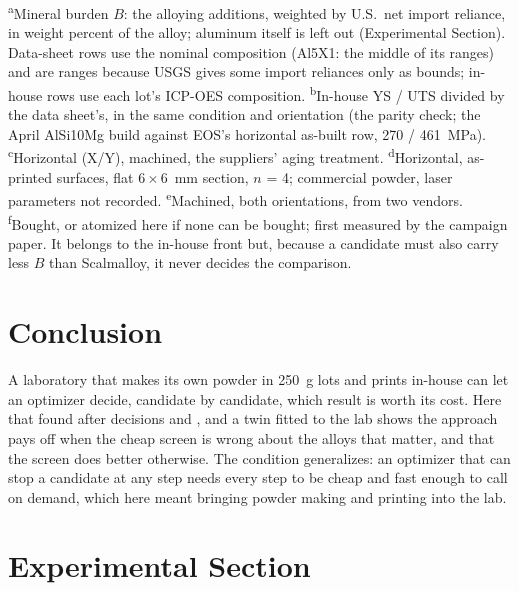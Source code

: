 \documentclass[11pt]{article}
\begin{document}
\begin{table}[t]
\smallskip
\raggedright\footnotesize \textsuperscript{a}Mineral burden $B$: the alloying
additions, weighted by U.S.\ net import reliance, in weight percent of the alloy;
aluminum itself is left out (Experimental Section). Data-sheet
rows use the nominal composition (Al5X1: the middle of its ranges) and are ranges
because USGS gives some import reliances only as bounds; in-house rows use each
lot's ICP-OES composition. \textsuperscript{b}In-house YS / UTS divided by the
data sheet's, in the same condition and orientation (the parity check; the April
AlSi10Mg build against EOS's horizontal as-built row, 270 / 461~MPa).
\textsuperscript{c}Horizontal (X/Y), machined, the suppliers' aging treatment.
\textsuperscript{d}Horizontal, as-printed surfaces, flat $6\times6$~mm section,
$n$ = 4; commercial powder, laser parameters not recorded.
\textsuperscript{e}Machined, both orientations, from two vendors.
\textsuperscript{f}Bought, or atomized here if none can be bought; first measured by
the campaign paper. It belongs to the in-house front but, because a candidate must
also carry less $B$ than Scalmalloy, it never decides the comparison.
\end{table}

\section{Conclusion}
\label{sec:conclusion}
 A laboratory that makes its own powder in \SI{250}{\gram} lots
and prints in-house can let an optimizer decide, candidate by candidate, which
result is worth its cost. Here that found  after  decisions
and \tbd{\$}, and a twin fitted to the lab shows the approach pays off when the
cheap screen is wrong about the alloys that matter, and that the screen does
better otherwise. The
condition generalizes: an optimizer that can stop a candidate at any step needs
every step to be cheap and fast enough to call on demand, which here meant
bringing powder making and printing into the lab.

\section{Experimental Section}
\label{sec:methods}
\end{document}
